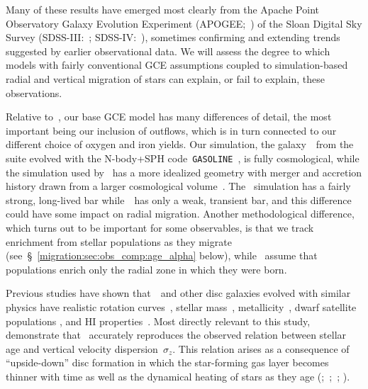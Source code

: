 Many of these results have emerged most clearly from the Apache Point 
Observatory Galaxy Evolution Experiment (APOGEE;~\citealp{Majewski2017}) of 
the Sloan Digital Sky Survey (SDSS-III:~\citealp{Eisenstein2011}; 
SDSS-IV:~\citealp{Blanton2017}), sometimes confirming and extending trends 
suggested by earlier observational data. We will assess the degree to which 
models with fairly conventional GCE assumptions coupled to simulation-based 
radial and vertical migration of stars can explain, or fail to explain, these 
observations. 
\par 
Relative to~\citet{Minchev2013, Minchev2014}, our base GCE model has many 
differences of detail, the most important being our inclusion of outflows, 
which is in turn connected to our different choice of oxygen and iron yields. 
Our simulation, the galaxy~\hsim~from the~\citet{Christensen2012} 
suite evolved with the N-body+SPH code~\texttt{GASOLINE}~\citep{Wadsley2004}, 
is fully cosmological, while the simulation used by~\citet{Minchev2013, 
Minchev2014} has a more idealized geometry with merger and accretion history 
drawn from a larger cosmological volume~\citep{Martig2012}. 
The~\citet{Minchev2013, Minchev2014} simulation has a fairly strong, 
long-lived bar while~\hsim~has only a weak, transient bar, and this difference 
could have some impact on radial migration. 
Another methodological difference, which turns out to be important for some 
observables, is that we track enrichment from stellar populations as they 
migrate (see~\S~\ref{migration:sec:obs_comp:age_alpha} below), while~\citet{Minchev2013, 
Minchev2014} assume that populations enrich only the radial zone in which they 
were born. 
\par 
Previous studies have shown that~\hsim~and other disc galaxies evolved with 
similar physics have realistic rotation curves~\citep{Governato2012, 
Christensen2014a, Christensen2014b}, stellar mass~\citep{Munshi2013}, 
metallicity~\citep{Christensen2016}, dwarf satellite populations 
\citep{Zolotov2012, Brooks2014}, and HI properties~\citep{Brooks2017}. 
Most directly relevant to this study,~\citet{Bird2021} demonstrate that 
\hsim~accurately reproduces the observed relation between stellar age and 
vertical velocity dispersion~$\sigma_z$. 
This relation arises as a consequence of ``upside-down'' disc formation in 
which the star-forming gas layer becomes thinner with time as well as the 
dynamical heating of stars as they age (\citealp*{Bournaud2009a, 
Bournaud2009b, Forbes2012};~\citealp{Bird2013};~\citealp*{Vincenzo2019a}; 
\citealp{Yu2021}). 
